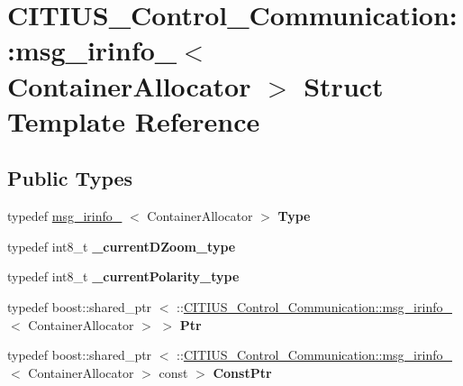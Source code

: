 \hypertarget{struct_c_i_t_i_u_s___control___communication_1_1msg__irinfo__}{\section{\-C\-I\-T\-I\-U\-S\-\_\-\-Control\-\_\-\-Communication\-:\-:msg\-\_\-irinfo\-\_\-$<$ \-Container\-Allocator $>$ \-Struct \-Template \-Reference}
\label{struct_c_i_t_i_u_s___control___communication_1_1msg__irinfo__}
}
\subsection*{\-Public \-Types}
\begin{DoxyCompactItemize}
\item 
\hypertarget{struct_c_i_t_i_u_s___control___communication_1_1msg__irinfo___a9aa6063136212f38785ffb9846b8e461}{typedef \hyperlink{struct_c_i_t_i_u_s___control___communication_1_1msg__irinfo__}{msg\-\_\-irinfo\-\_\-}\*
$<$ \-Container\-Allocator $>$ {\bfseries \-Type}}\label{struct_c_i_t_i_u_s___control___communication_1_1msg__irinfo___a9aa6063136212f38785ffb9846b8e461}

\item 
\hypertarget{struct_c_i_t_i_u_s___control___communication_1_1msg__irinfo___a451f90de447dd1869efa57c86436b5d0}{typedef int8\-\_\-t {\bfseries \-\_\-current\-D\-Zoom\-\_\-type}}\label{struct_c_i_t_i_u_s___control___communication_1_1msg__irinfo___a451f90de447dd1869efa57c86436b5d0}

\item 
\hypertarget{struct_c_i_t_i_u_s___control___communication_1_1msg__irinfo___a307be40fdb44af9daac22ced0a13b009}{typedef int8\-\_\-t {\bfseries \-\_\-current\-Polarity\-\_\-type}}\label{struct_c_i_t_i_u_s___control___communication_1_1msg__irinfo___a307be40fdb44af9daac22ced0a13b009}

\item 
\hypertarget{struct_c_i_t_i_u_s___control___communication_1_1msg__irinfo___aa5efcb827c3a37eb6f5024b915b01a41}{typedef boost\-::shared\-\_\-ptr\*
$<$ \-::\hyperlink{struct_c_i_t_i_u_s___control___communication_1_1msg__irinfo__}{\-C\-I\-T\-I\-U\-S\-\_\-\-Control\-\_\-\-Communication\-::msg\-\_\-irinfo\-\_\-}\*
$<$ \-Container\-Allocator $>$ $>$ {\bfseries \-Ptr}}\label{struct_c_i_t_i_u_s___control___communication_1_1msg__irinfo___aa5efcb827c3a37eb6f5024b915b01a41}

\item 
\hypertarget{struct_c_i_t_i_u_s___control___communication_1_1msg__irinfo___a87f64ce58d8994ffc0098ff390bf0f92}{typedef boost\-::shared\-\_\-ptr\*
$<$ \-::\hyperlink{struct_c_i_t_i_u_s___control___communication_1_1msg__irinfo__}{\-C\-I\-T\-I\-U\-S\-\_\-\-Control\-\_\-\-Communication\-::msg\-\_\-irinfo\-\_\-}\*
$<$ \-Container\-Allocator $>$ const  $>$ {\bfseries \-Const\-Ptr}}\label{struct_c_i_t_i_u_s___control___communication_1_1msg__irinfo___a87f64ce58d8994ffc0098ff390bf0f92}

\end{DoxyCompactItemize}
